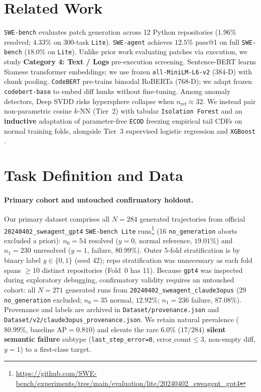 \section{Related Work}
\texttt{SWE-bench} \citep{jimenez2024swebench} evaluates patch generation across 12 Python repositories ($1.96\%$ resolved; $4.33\%$ on 300-task \texttt{Lite}). \texttt{SWE-agent} \citep{yang2024sweagent} achieves $12.5\%$ pass@1 on full \texttt{SWE-bench} ($18.0\%$ on \texttt{Lite}). Unlike prior work evaluating patches via execution, we study \textbf{Category 4: Text / Logs} pre-execution screening. Sentence-BERT \citep{reimers2019sentencebert} learns Siamese transformer embeddings; we use frozen \texttt{all-MiniLM-L6-v2} (384-D) with chunk pooling. \texttt{CodeBERT} \citep{feng2020codebert} pre-trains bimodal RoBERTa (768-D); we adapt frozen \texttt{codebert-base} to embed diff hunks without fine-tuning. Among anomaly detectors, Deep SVDD \citep{ruff2018deepsvdd} risks hypersphere collapse when $n_{\text{ref}}\approx 32$. We instead pair non-parametric cosine $k$-NN (Tier~2) with tabular \texttt{Isolation Forest} \citep{liu2008isolation} and an \textbf{inductive} adaptation of parameter-free \texttt{ECOD} \citep{li2022ecod} freezing empirical tail CDFs on normal training folds, alongside Tier~3 supervised logistic regression and \texttt{XGBoost} \citep{chen2016xgboost}.

\section{Task Definition and Data}
\paragraph{Primary cohort and untouched confirmatory holdout.}
Our primary dataset comprises all $N=284$ generated trajectories from official \texttt{20240402\_sweagent\_gpt4} \texttt{SWE-bench Lite} runs\footnote{\url{https://github.com/SWE-bench/experiments/tree/main/evaluation/lite/20240402_sweagent_gpt4}} (16 \texttt{no\_generation} aborts excluded a priori): $n_0=54$ resolved ($y=0$, normal reference, $19.01\%$) and $n_1=230$ unresolved ($y=1$, failure, $80.99\%$). Outer 5-fold stratification is by binary label $y\in\{0,1\}$ (seed 42); repo stratification was unnecessary as each fold spans $\ge 10$ distinct repositories (Fold~0 has 11). Because \texttt{gpt4} was inspected during exploratory debugging, confirmatory validity requires an untouched cohort: all $N=271$ generated runs from \texttt{20240402\_sweagent\_claude3opus} (29 \texttt{no\_generation} excluded; $n_0=35$ normal, $12.92\%$; $n_1=236$ failure, $87.08\%$). Provenance and labels are archived in \texttt{Dataset/provenance.json} and \texttt{Dataset/v2/claude3opus\_provenance.json}. We retain natural prevalence ($80.99\%$, baseline $\mathrm{AP}=0.810$) and elevate the rare $6.0\%$ ($17/284$) \textbf{silent semantic failure} subtype (\texttt{last\_step\_error=0}, $\mathrm{error\_count}\le 3$, non-empty diff, $y=1$) to a first-class target.

